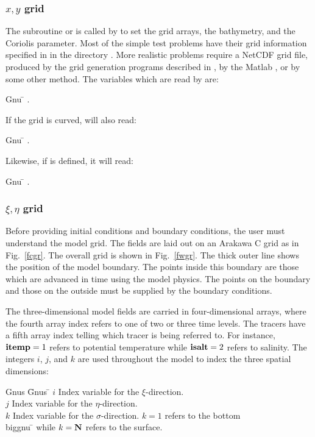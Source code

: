 \subsubsection{$x,y$ grid}
The subroutine  or  is called by
 to set the grid arrays, the bathymetry, and the
Coriolis parameter.  Most of the simple test problems have their grid
information specified in  in the directory
.  More realistic problems require a NetCDF grid
file, produced by the grid generation programs described in
\citet{GRIDS}, by the Matlab , or by some
other method.  The variables which are read by  are:
\begin{tabbing}
  Gnu \= \kill
  \> .
\end{tabbing}
If the grid is curved,  will also read:
\begin{tabbing}
  Gnu \= \kill
  \> .
\end{tabbing}
Likewise, if  is defined, it will read:
\begin{tabbing}
  Gnu \= \kill
  \> .
\end{tabbing}

\subsubsection {$\xi,\eta$ grid}
Before providing initial conditions and boundary conditions, the
user must understand the model grid. The fields are laid out on an
Arakawa C grid as in Fig.\ \ref{fcgr}. The overall grid is shown in
Fig.\ \ref{fwgr}.  The thick outer line shows the position of the
model boundary. The points inside this boundary are those which are
advanced in time using the model physics. The points on the boundary
and those on the outside must be supplied by the boundary
conditions.

The three-dimensional model fields are carried in four-dimensional
arrays, where the fourth array index refers to one of two or three
time levels. The tracers have a fifth array index telling which
tracer is being referred to.
For instance, $\mbox{\bf itemp}=1$ refers to
potential temperature while $\mbox{\bf isalt}=2$ refers to salinity.  The
integers $i$, $j$, and $k$ are used throughout the model to index
the three spatial dimensions:
\begin{tabbing}
Gnus \= Gnus \= \kill
   \>$i$ \>Index variable for the $\xi$-direction. \\
   \>$j$ \>Index variable for the $\eta$-direction. \\
   \>$k$ \>Index variable for the $\sigma$-direction.  $k = 1$
   refers to the bottom \\
biggnu \= \kill
   \>while $k = \mbox{\bf N}$ refers to the surface.
\end{tabbing}

